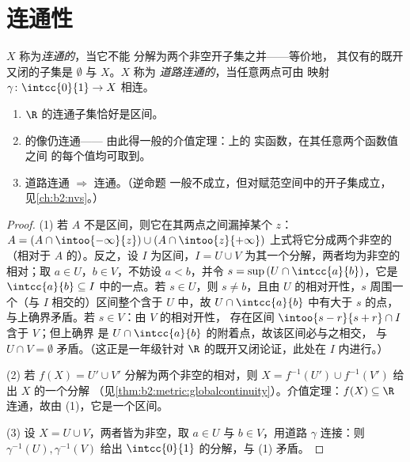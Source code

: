 \section{连通性}

\begin{definition}\label{def:b2:metric:connected}
$X$ 称为\emph{连通的}，当它不能
分解为两个非空开子集之并——等价地，
其仅有的既开又闭的子集是 $\emptyset$ 与 $X$。$X$ 称为
\emph{道路连通的}，当任意两点可由
映射 $\gamma \colon \intcc{0}{1} \to X$ 相连。
\end{definition}

\begin{theorem}\label{thm:b2:metric:connectedness}
\begin{enumerate}
  \item $\R$ 的连通子集恰好是区间。
  \item {}的像仍连通——
        由此得一般的介值定理：上的
        实函数，在其任意两个函数值之间
        的每个值均可取到。
  \item 道路连通 $\Rightarrow$ 连通。（逆命题
        一般不成立，但对赋范空间中的开子集成立，
        见\cref{ch:b2:nvs}。）
\end{enumerate}
\end{theorem}

\begin{proof}
(1) 若 $A$ 不是区间，则它在其两点之间漏掉某个 $z$：
$A = (A \cap \intoo{-\infty}{z}) \cup (A \cap \intoo{z}{+\infty})$
上式将它分成两个非空的（相对于 $A$ 的）。反之，设
$I$ 为区间，$I = U \cup V$ 为其一个分解，两者均为非空的
相对；取 $a \in U$，$b \in V$，不妨设 $a < b$，并令
$s = \sup\,(U \cap \intcc{a}{b})$，它是 $\intcc{a}{b}
\subseteq I$ 中的一点。若 $s \in U$，则 $s \neq b$，且由
$U$ 的相对开性，$s$ 周围一个（与 $I$ 相交的）区间整个含于
$U$ 中，故 $U \cap \intcc{a}{b}$ 中有大于 $s$ 的点，
与上确界矛盾。若 $s \in V$：由 $V$ 的相对开性，
存在区间 $\intoo{s - r}{s + r} \cap I$ 含于 $V$；但上确界
是 $U \cap \intcc{a}{b}$ 的附着点，故该区间必与之相交，
与 $U \cap V = \emptyset$ 矛盾。（这正是一年级针对
$\R$ 的既开又闭论证，此处在 $I$ 内进行。）

(2) 若 $f(X) = U' \cup V'$ 分解为两个非空的相对，则 $X = f^{-1}(U') \cup f^{-1}(V')$ 给出 $X$ 的一个分解
（见\cref{thm:b2:metric:globalcontinuity}）。介值定理：$f(X) \subseteq \R$
连通，故由 (1)，它是一个区间。

(3) 设 $X = U \cup V$，两者皆为非空，取 $a \in U$
与 $b \in V$，用道路 $\gamma$ 连接：则 $\gamma^{-1}(U),
\gamma^{-1}(V)$ 给出 $\intcc{0}{1}$ 的分解，与 (1) 矛盾。
\end{proof}

